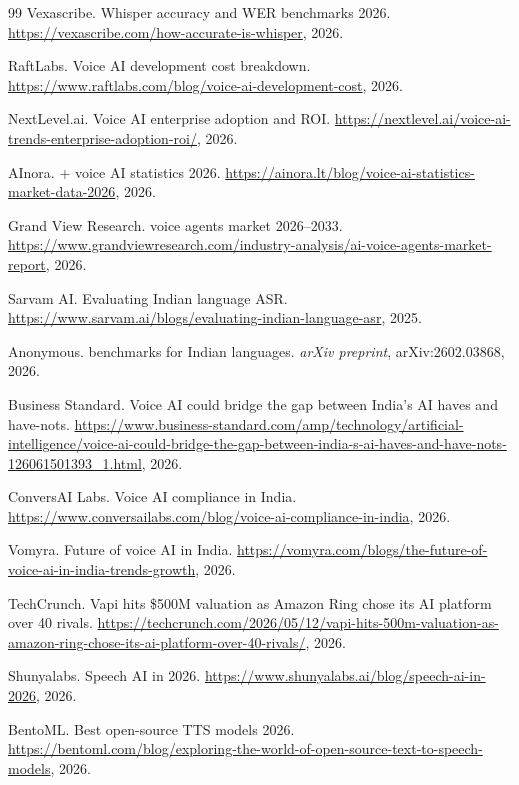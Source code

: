 \documentclass[12pt,a4paper]{article}
\begin{document}
\begin{thebibliography}{99}
Vexascribe.
\newblock Whisper accuracy and {WER} benchmarks 2026.
\newblock \url{https://vexascribe.com/how-accurate-is-whisper}, 2026.

{RaftLabs}.
\newblock Voice {AI} development cost breakdown.
\newblock \url{https://www.raftlabs.com/blog/voice-ai-development-cost}, 2026.

{NextLevel.ai}.
\newblock Voice {AI} enterprise adoption and {ROI}.
\newblock \url{https://nextlevel.ai/voice-ai-trends-enterprise-adoption-roi/}, 2026.

{AInora}.
+ voice {AI} statistics 2026.
\newblock \url{https://ainora.lt/blog/voice-ai-statistics-market-data-2026}, 2026.

{Grand View Research}.
 voice agents market 2026--2033.
\newblock \url{https://www.grandviewresearch.com/industry-analysis/ai-voice-agents-market-report}, 2026.

{Sarvam AI}.
\newblock Evaluating {Indian} language {ASR}.
\newblock \url{https://www.sarvam.ai/blogs/evaluating-indian-language-asr}, 2025.

Anonymous.
 benchmarks for {Indian} languages.
\newblock \textit{arXiv preprint}, arXiv:2602.03868, 2026.

{Business Standard}.
\newblock Voice {AI} could bridge the gap between {India}'s {AI} haves and have-nots.
\newblock \url{https://www.business-standard.com/amp/technology/artificial-intelligence/voice-ai-could-bridge-the-gap-between-india-s-ai-haves-and-have-nots-126061501393_1.html}, 2026.

{ConversAI Labs}.
\newblock Voice {AI} compliance in {India}.
\newblock \url{https://www.conversailabs.com/blog/voice-ai-compliance-in-india}, 2026.

{Vomyra}.
\newblock Future of voice {AI} in {India}.
\newblock \url{https://vomyra.com/blogs/the-future-of-voice-ai-in-india-trends-growth}, 2026.

{TechCrunch}.
\newblock Vapi hits \$500{M} valuation as {Amazon Ring} chose its {AI} platform over 40 rivals.
\newblock \url{https://techcrunch.com/2026/05/12/vapi-hits-500m-valuation-as-amazon-ring-chose-its-ai-platform-over-40-rivals/}, 2026.

{Shunyalabs}.
\newblock Speech {AI} in 2026.
\newblock \url{https://www.shunyalabs.ai/blog/speech-ai-in-2026}, 2026.

{BentoML}.
\newblock Best open-source {TTS} models 2026.
\newblock \url{https://bentoml.com/blog/exploring-the-world-of-open-source-text-to-speech-models}, 2026.

\end{thebibliography}
\end{document}
